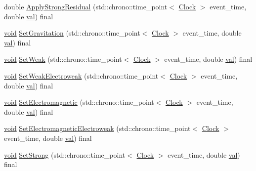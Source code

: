 \begin{DoxyCompactItemize}
\item 
double \mbox{\hyperlink{class_solid_a07534fa79bb8a6eb32e081e5158ba9e5}{Apply\+Strong\+Residual}} (std\+::chrono\+::time\+\_\+point$<$ \mbox{\hyperlink{universe_8h_a0ef8d951d1ca5ab3cfaf7ab4c7a6fd80}{Clock}} $>$ event\+\_\+time, double \mbox{\hyperlink{glad_8h_a26942fd2ed566ef553eae82d2c109c8f}{val}}) final
\item 
\mbox{\hyperlink{glad_8h_a950fc91edb4504f62f1c577bf4727c29}{void}} \mbox{\hyperlink{class_solid_ae237f2c713868c133e28ed7f75fc9125}{Set\+Gravitation}} (std\+::chrono\+::time\+\_\+point$<$ \mbox{\hyperlink{universe_8h_a0ef8d951d1ca5ab3cfaf7ab4c7a6fd80}{Clock}} $>$ event\+\_\+time, double \mbox{\hyperlink{glad_8h_a26942fd2ed566ef553eae82d2c109c8f}{val}}) final
\item 
\mbox{\hyperlink{glad_8h_a950fc91edb4504f62f1c577bf4727c29}{void}} \mbox{\hyperlink{class_solid_aa28e0f7e4de2fc0c1e28d385214296bf}{Set\+Weak}} (std\+::chrono\+::time\+\_\+point$<$ \mbox{\hyperlink{universe_8h_a0ef8d951d1ca5ab3cfaf7ab4c7a6fd80}{Clock}} $>$ event\+\_\+time, double \mbox{\hyperlink{glad_8h_a26942fd2ed566ef553eae82d2c109c8f}{val}}) final
\item 
\mbox{\hyperlink{glad_8h_a950fc91edb4504f62f1c577bf4727c29}{void}} \mbox{\hyperlink{class_solid_adb34befc66f8c681f3a85c44e0d00e3a}{Set\+Weak\+Electroweak}} (std\+::chrono\+::time\+\_\+point$<$ \mbox{\hyperlink{universe_8h_a0ef8d951d1ca5ab3cfaf7ab4c7a6fd80}{Clock}} $>$ event\+\_\+time, double \mbox{\hyperlink{glad_8h_a26942fd2ed566ef553eae82d2c109c8f}{val}}) final
\item 
\mbox{\hyperlink{glad_8h_a950fc91edb4504f62f1c577bf4727c29}{void}} \mbox{\hyperlink{class_solid_a9a660f9d94f597712c67922aa1d4d795}{Set\+Electromagnetic}} (std\+::chrono\+::time\+\_\+point$<$ \mbox{\hyperlink{universe_8h_a0ef8d951d1ca5ab3cfaf7ab4c7a6fd80}{Clock}} $>$ event\+\_\+time, double \mbox{\hyperlink{glad_8h_a26942fd2ed566ef553eae82d2c109c8f}{val}}) final
\item 
\mbox{\hyperlink{glad_8h_a950fc91edb4504f62f1c577bf4727c29}{void}} \mbox{\hyperlink{class_solid_a6617ae9fe4707d760a23b54eddf00dec}{Set\+Electromagnetic\+Electroweak}} (std\+::chrono\+::time\+\_\+point$<$ \mbox{\hyperlink{universe_8h_a0ef8d951d1ca5ab3cfaf7ab4c7a6fd80}{Clock}} $>$ event\+\_\+time, double \mbox{\hyperlink{glad_8h_a26942fd2ed566ef553eae82d2c109c8f}{val}}) final
\item 
\mbox{\hyperlink{glad_8h_a950fc91edb4504f62f1c577bf4727c29}{void}} \mbox{\hyperlink{class_solid_a478e15cdf15c5bb01cbcbd5f584ef83a}{Set\+Strong}} (std\+::chrono\+::time\+\_\+point$<$ \mbox{\hyperlink{universe_8h_a0ef8d951d1ca5ab3cfaf7ab4c7a6fd80}{Clock}} $>$ event\+\_\+time, double \mbox{\hyperlink{glad_8h_a26942fd2ed566ef553eae82d2c109c8f}{val}}) final

\end{DoxyCompactItemize}

